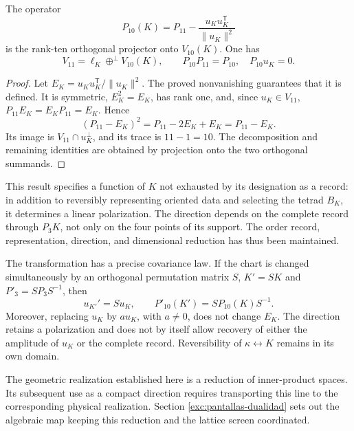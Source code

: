 \begin{proposition}
\label{prop:k-reduccion-diez}
The operator
\begin{equation}
 P_{10}(K)=P_{11}
       -\frac{u_Ku_K^{\mathsf T}}{\lVert u_K\rVert^2}
 \label{eq:k-proyector-diez}
\end{equation}
is the rank-ten orthogonal projector onto \(V_{10}(K)\). One has
\[
 V_{11}=\ell_K\mathbin{\oplus^{\perp}}V_{10}(K),
 \qquad P_{10}P_{11}=P_{10},\quad P_{10}u_K=0.
\]
\end{proposition}
\begin{proof}
Let \(E_K=u_Ku_K^{\mathsf T}/\lVert u_K\rVert^2\). The
proved nonvanishing guarantees that it is defined. It is symmetric,
\(E_K^2=E_K\), has rank one, and, since \(u_K\in V_{11}\),
\(P_{11}E_K=E_KP_{11}=E_K\). Hence
\[
 (P_{11}-E_K)^2=P_{11}-2E_K+E_K=P_{11}-E_K.
\]
Its image is \(V_{11}\cap u_K^\perp\), and its trace is
\(11-1=10\). The decomposition and remaining identities are
obtained by projection onto the two orthogonal summands.
\end{proof}

This result specifies a function of \(K\) not exhausted by its designation as
a record: in addition to reversibly representing oriented
data and selecting the tetrad \(B_K\), it determines a
linear polarization. The direction depends on the complete record
through \(P_3K\), not only on the four points of its support.
The order record, representation, direction, and
dimensional reduction has thus been maintained.

The transformation has a precise covariance law. If the chart is
changed simultaneously by an orthogonal permutation matrix \(S\),
\(K'=SK\) and \(P'_3=SP_3S^{-1}\), then
\[
 u_{K'}'=Su_K,\qquad P'_{10}(K')=SP_{10}(K)S^{-1}.
\]
Moreover, replacing \(u_K\) by \(a u_K\), with \(a\ne0\),
does not change \(E_K\). The direction retains a polarization and does not
by itself allow recovery of either the amplitude of \(u_K\) or the
complete record. Reversibility of \(\kappa\leftrightarrow K\)
remains in its own domain.

The geometric realization established here is a reduction of inner-product
spaces. Its subsequent use as a compact direction
requires transporting this line to the corresponding physical realization.
Section \ref{exc:pantallas-dualidad} sets out the algebraic map
keeping this reduction and the lattice screen coordinated.
